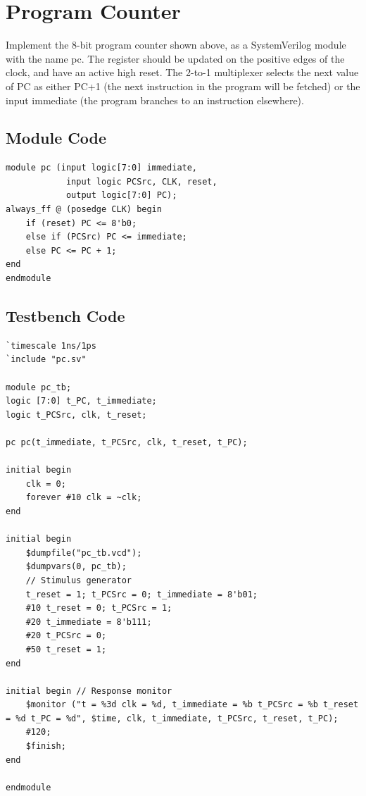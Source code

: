 \documentclass{article}
\begin{document}
\newpage
\section{Program Counter}
Implement the 8-bit program counter shown above, as a SystemVerilog module with the name pc. The register should be updated on the positive edges of the clock, and have an active high reset. The 2-to-1 multiplexer selects the next value of PC as either PC+1 (the next instruction in the program will be fetched) or the input immediate (the program branches to an instruction elsewhere).

\subsection{Module Code}
\begin{lstlisting}
module pc (input logic[7:0] immediate, 
            input logic PCSrc, CLK, reset,
            output logic[7:0] PC);
always_ff @ (posedge CLK) begin
    if (reset) PC <= 8'b0; 
    else if (PCSrc) PC <= immediate;
    else PC <= PC + 1; 
end
endmodule
\end{lstlisting}

\subsection{Testbench Code}
\begin{lstlisting}
`timescale 1ns/1ps
`include "pc.sv"

module pc_tb;
logic [7:0] t_PC, t_immediate;
logic t_PCSrc, clk, t_reset;

pc pc(t_immediate, t_PCSrc, clk, t_reset, t_PC);

initial begin
    clk = 0;
    forever #10 clk = ~clk;
end

initial begin
    $dumpfile("pc_tb.vcd"); 
    $dumpvars(0, pc_tb);
    // Stimulus generator
    t_reset = 1; t_PCSrc = 0; t_immediate = 8'b01;
    #10 t_reset = 0; t_PCSrc = 1;
    #20 t_immediate = 8'b111;
    #20 t_PCSrc = 0;
    #50 t_reset = 1;
end

initial begin // Response monitor
    $monitor ("t = %3d clk = %d, t_immediate = %b t_PCSrc = %b t_reset = %d t_PC = %d", $time, clk, t_immediate, t_PCSrc, t_reset, t_PC);
    #120;
    $finish; 
end

endmodule
\end{lstlisting}
\end{document}
